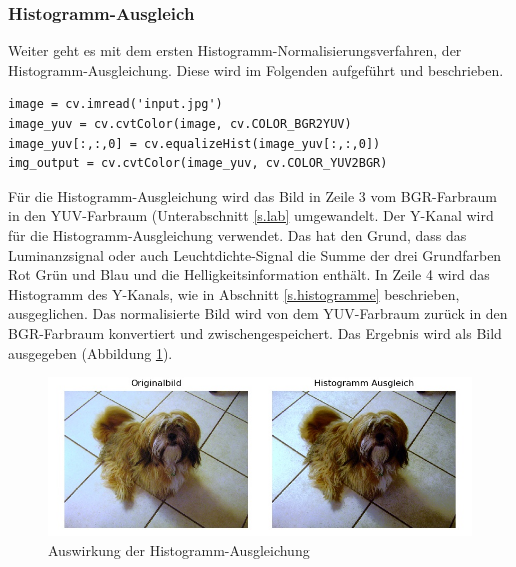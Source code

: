 \subsubsection{Histogramm-Ausgleich}
Weiter geht es mit dem ersten Histogramm-Normalisierungsverfahren, der Histogramm-Ausgleichung. Diese wird im Folgenden aufgeführt und beschrieben.\\
\begin{lstlisting}
image = cv.imread('input.jpg')
image_yuv = cv.cvtColor(image, cv.COLOR_BGR2YUV)
image_yuv[:,:,0] = cv.equalizeHist(image_yuv[:,:,0])
img_output = cv.cvtColor(image_yuv, cv.COLOR_YUV2BGR)
\end{lstlisting}
Für die Histogramm-Ausgleichung \cite{histogram2012equalisation} wird das Bild in Zeile 3 vom BGR-Farbraum in den YUV-Farbraum (Unterabschnitt \ref{s.lab} umgewandelt. Der Y-Kanal wird für die Histogramm-Ausgleichung verwendet. Das hat den Grund, dass das Luminanzsignal oder auch Leuchtdichte-Signal die Summe der drei Grundfarben Rot Grün und Blau und die Helligkeitsinformation enthält. In Zeile 4 wird das Histogramm des Y-Kanals, wie in Abschnitt \ref{s.histogramme} beschrieben, ausgeglichen. Das normalisierte Bild wird von dem YUV-Farbraum zurück in den BGR-Farbraum konvertiert und zwischengespeichert. Das Ergebnis wird als Bild ausgegeben (Abbildung \ref{img:histogrameq}).
\begin{figure}
	[h]
	\centering
	\includegraphics[scale=0.7]{Sources/histeq.jpg}
	\caption{Auswirkung der Histogramm-Ausgleichung}
	\label{img:histogrameq}
\end{figure}	
\newpage
